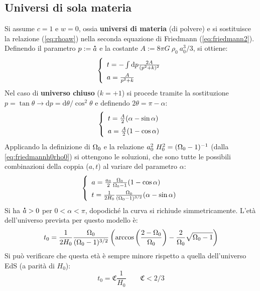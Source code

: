 \subsection{Universi di sola materia}
Si assume $c=1$ e $w=0$, ossia \textbf{universi di materia} (di polvere) e si sostituisce la relazione (\ref{eq:rhoaw}) nella seconda equazione di Friedmann (\ref{eq:friedmann2}). Definendo il parametro $p:=\accentset{\mbox{\large\bfseries .}}{a}$ e la costante $A:= 8\pi G ~\rho_0 ~ a_0^3 /3$, si ottiene:
\begin{equation*}\left\{
\def\arraystretch{1.5}
    \begin{array}{ll}
    t=-\int \mathrm{d}p \frac{2A}{(p^2+k)^2} \\
    a=\frac{A}{p^2+k}
\end{array}\right.
\end{equation*}
Nel caso di \textbf{universo chiuso} ($k=+1$) si procede tramite la sostituzione $p= \tan \theta \rightarrow \mathrm{d}p=\mathrm{d}\theta / \cos^2 \theta$ e definendo $2\theta = \pi-\alpha$:
\begin{equation*}\left\{
\def\arraystretch{1.5}
    \begin{array}{ll}
    t=\frac{A}{2}(\alpha - \sin \alpha) \\
    a=\frac{A}{2}(1 - \cos \alpha)
\end{array}\right.
\end{equation*}
Applicando la definizione di $\Omega_0$ e la relazione $a_0^2 ~H_0^2 = (\Omega_0 -1)^{-1}$ (dalla \ref{eq:friedmannh0rho0}) si ottengono le soluzioni, che sono tutte le possibili combinazioni della coppia ($a,t$) al variare del parametro $\alpha$:
\begin{equation}\left\{
\def\arraystretch{1.5}
    \begin{array}{ll}
    a=\frac{a_0}{2} \frac{\OmegaO}{\OmegaO -1}    (1 - \cos \alpha) \\
    t=\frac{1}{2H_0} \frac{\OmegaO}{(\OmegaO -1)^{3/2}}  (\alpha - \sin \alpha)
\end{array}\right.
\end{equation}
Si ha $\accentset{\mbox{\large\bfseries .}}{a}>0$ per $0<\alpha < \pi$, dopodiché la curva si richiude simmetricamente. L'età dell'universo prevista per questo modello è:
\begin{equation*}
    t_0 = \frac{1}{2H_0}\frac{\Omega_0}{(\Omega_0 -1)^{3/2}}\left ( \arccos{\left ( \frac{2-\Omega_0}{\Omega_0} \right )}  -\frac{2}{\Omega_0}\sqrt{\Omega_0-1} \right )
\end{equation*}
Si può verificare che questa età è sempre minore rispetto a quella dell'universo EdS (a parità di $H_0$):
\begin{equation}
t_0 = \mathfrak{C} \frac{1}{H_0}\qquad \mathfrak{C}< 2/3
\end{equation}


